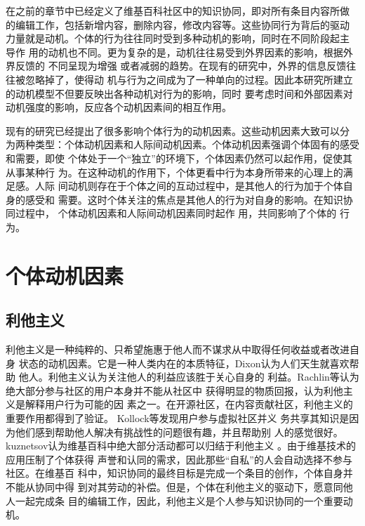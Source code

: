 在之前的章节中已经定义了维基百科社区中的知识协同，即对所有条目内容所做
的编辑工作，包括新增内容，删除内容，修改内容等。这些协同行为背后的驱动
力量就是动机。个体的行为往往同时受到多种动机的影响，同时在不同阶段起主
导作
用的动机也不同。更为复杂的是，动机往往易受到外界因素的影响，根据外界反馈的
不同呈现为增强
或者减弱的趋势。在现有的研究中，外界的信息反馈往往被忽略掉了，使得动
机与行为之间成为了一种单向的过程。因此本研究所建立的动机模型不但要反映出各种动机对行为的影响，同时
要考虑时间和外部因素对动机强度的影响，反应各个动机因素间的相互作用。

现有的研究已经提出了很多影响个体行为的动机因素。这些动机因素大致可以分
为两种类型：个体动机因素和人际间动机因素。个体动机因素强调个体固有的感受和需要，即使
个体处于一个“独立”的环境下，个体因素仍然可以起作用，促使其从事某种行
为。在这种动机的作用下，个体更看中行为本身所带来的心理上的满足感。人际
间动机则存在于个体之间的互动过程中，是其他人的行为加于个体自身的感受和
需要。这时个体关注的焦点是其他人的行为对自身的影响。在知识协同过程中，
个体动机因素和人际间动机因素同时起作
用，共同影响了个体的
行为。

\section{个体动机因素}
\label{sec:individual-factor}

\subsection{利他主义}
\label{sec:altruism}

利他主义是一种纯粹的、只希望施惠于他人而不谋求从中取得任何收益或者改进自身
状态的动机因素。它是一种人类内在的本质特征，Dixon认为人们天生就喜欢帮助
他人\cite{dixon2000ckc}。利他主义认为关注他人的利益应该胜于关心自身的
利益。Rachlin等认为绝大部分参与社区的用户本身并不能从社区中
获得明显的物质回报，认为利他主义是解释用户行为可能的因
素之一\cite{rachlin2002altruism}。在开源社区，在内容贡献社区，利他主义的重要作用都得到了验证\cite{oreg2008exploring}。
Kollock等发现用户参与虚拟社区并义
务共享其知识是因为他们感到帮助他人解决有挑战性的问题很有趣，并且帮助别
人的感觉很好\cite{Smith1999}。kuznetsov认为维基百科中绝大部分活动都可以归结于利他主义
\cite{kuznetsov2006motivations}。由于维基技术的应用压制了个体获得
声誉和认同的需求，因此那些“自私”的人会自动选择不参与社区\cite{4076406}。在维基百
科中，知识协同的最终目标是完成一个条目的创作，个体自身并不能从协同中得
到对其劳动的补偿。但是，个体在利他主义的驱动下，愿意同他人一起完成条
目的编辑工作，因此，利他主义是个人参与知识协同的一个重要动机。

